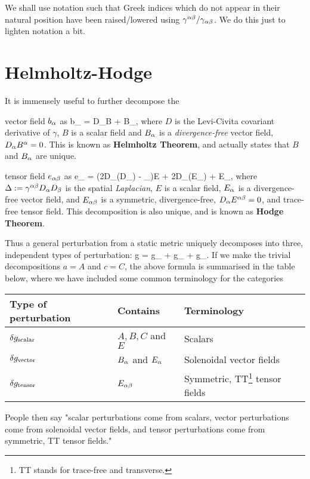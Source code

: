 \br 
    We shall use notation such that Greek indices which do not appear in their natural position have been raised/lowered using $\gamma^{\alpha\beta}/\gamma_{\alpha\beta}$. We do this just to lighten notation a bit.
\er 

\section{Helmholtz-Hodge}

It is immensely useful to further decompose the
\ben[label=(\alph*)]
    \item vector field $b_{\alpha}$ as 
    \bse 
        b_{\a} = D_{\a}B + B_{\a},
    \ese 
    where $D$ is the Levi-Civita covariant derivative of $\gamma$, $B$ is a scalar field and $B_{\alpha}$ is a \textit{divergence-free} vector field, $D_{\alpha} B^{\alpha}=0$. This is known as \textbf{Helmholtz Theorem}, and actually states that $B$ and $B_{\alpha}$ are unique. 
    \item tensor field $e_{\alpha\beta}$ as
    \bse 
        e_{\a\beta} = \bigg(2D_{(\a}D_{\beta)} - \gamma_{\a\beta}\Delta\bigg)E + 2D_{(\a}E_{\beta)} + E_{\a\beta},
    \ese 
    where $\Delta := \gamma^{\alpha\beta}D_{\alpha}D_{\beta}$ is the spatial \textit{Laplacian}, $E$ is a scalar field, $E_{\alpha}$ is a divergence-free vector field, and $E_{\alpha\beta}$ is a symmetric,  divergence-free, $D_{\alpha}E^{\alpha\beta} = 0$, and trace-free tensor field. This decomposition is also unique, and is known as \textbf{Hodge Theorem}. 
\een 

Thus a general perturbation from a static metric uniquely decomposes into three, independent types of perturbation:
\bse 
    \del g = \del g_{} + \del g_{} + \del g_{}.
\ese 
If we make the trivial decompositions $a=A$ and $c=C$, the above formula is summarised in the table below, where we have included some common terminology for the categories
\begin{center}
    \begin{tabular}{@{} p{5cm}p{4cm}p{5cm} @{}}
	    \toprule
	    Type of perturbation & Contains & Terminology \\
	    \midrule 
	    $\delta g_{\text{scalar}}$ & $A,B,C$ and $E$ & Scalars \\
	    $\delta g_{\text{vector}}$ & $B_{\alpha}$ and $E_{\alpha}$ & Solenoidal vector fields\\
	    $\delta g_{\text{tensor}}$ & $E_{\alpha\beta}$ & Symmetric, TT\footnote{TT stands for trace-free and transverse.} tensor fields \\
	    \bottomrule
    \end{tabular}
\end{center}
People then say "scalar perturbations come from scalars, vector perturbations come from solenoidal vector fields, and tensor perturbations come from symmetric, TT tensor fields."

